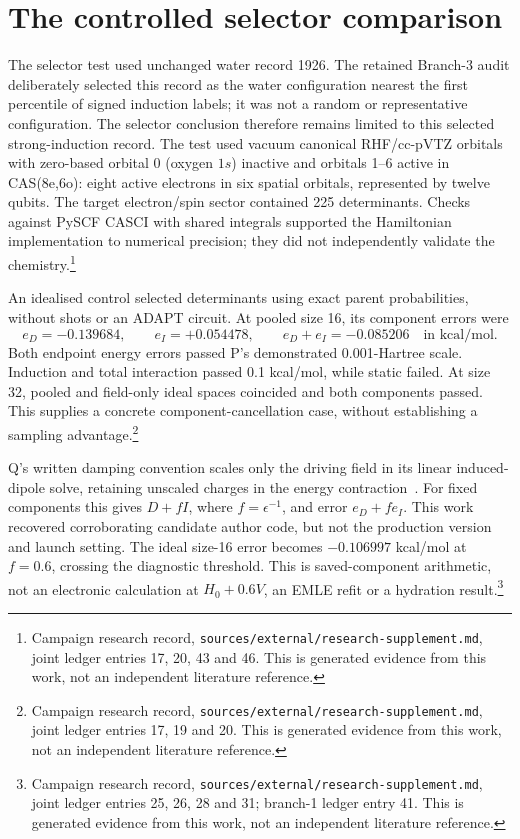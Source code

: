 \documentclass{article}
\newcommand{\record}[1]{\footnote{Campaign research record, \texttt{sources/external/research-supplement.md}, #1. This is generated evidence from this work, not an independent literature reference.}}
\begin{document}
\section{The controlled selector comparison}
The selector test used unchanged water record 1926. The retained Branch-3 audit deliberately selected this record as the water configuration nearest the first percentile of signed induction labels; it was not a random or representative configuration. The selector conclusion therefore remains limited to this selected strong-induction record. The test used vacuum canonical RHF/cc-pVTZ orbitals with zero-based orbital 0 (oxygen \(1s\)) inactive and orbitals 1--6 active in CAS(8e,6o): eight active electrons in six spatial orbitals, represented by twelve qubits. The target electron/spin sector contained 225 determinants. Checks against PySCF CASCI with shared integrals supported the Hamiltonian implementation to numerical precision; they did not independently validate the chemistry.\record{joint ledger entries 17, 20, 43 and 46}

An idealised control selected determinants using exact parent probabilities, without shots or an ADAPT circuit. At pooled size 16, its component errors were
\[
 e_D=-0.139684,\qquad e_I=+0.054478,\qquad
 e_D+e_I=-0.085206
 \quad\text{in kcal/mol}.
\]
Both endpoint energy errors passed P's demonstrated 0.001-Hartree scale. Induction and total interaction passed 0.1 kcal/mol, while static failed. At size 32, pooled and field-only ideal spaces coincided and both components passed. This supplies a concrete component-cancellation case, without establishing a sampling advantage.\record{joint ledger entries 17, 19 and 20}

Q's written damping convention scales only the driving field in its linear induced-dipole solve, retaining unscaled charges in the energy contraction~\cite{Q}. For fixed components this gives \(D+fI\), where \(f=\epsilon^{-1}\), and error \(e_D+fe_I\). This work recovered corroborating candidate author code, but not the production version and launch setting. The ideal size-16 error becomes \(-0.106997\) kcal/mol at \(f=0.6\), crossing the diagnostic threshold. This is saved-component arithmetic, not an electronic calculation at \(H_0+0.6V\), an EMLE refit or a hydration result.\record{joint ledger entries 25, 26, 28 and 31; branch-1 ledger entry 41}
\end{document}
